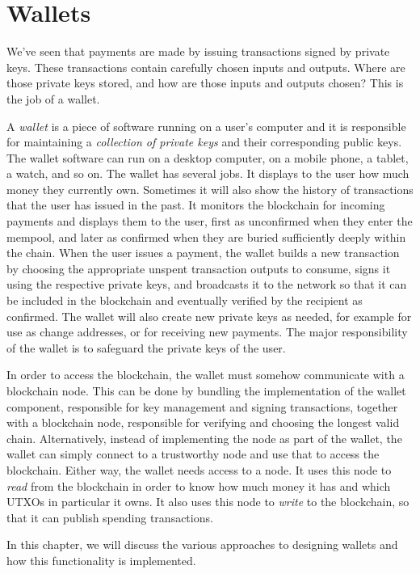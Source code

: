 \chapter{Wallets}

We've seen that payments are made by issuing transactions signed by private keys.
These transactions contain carefully chosen inputs and outputs. Where are those
private keys stored, and how are those inputs and outputs chosen? This is the job
of a wallet.

A \emph{wallet} is a piece of software running on a user's computer and it is
responsible for maintaining a \emph{collection of private keys} and their corresponding
public keys. The wallet software can run on a desktop computer, on a mobile phone,
a tablet, a watch, and so on.
The wallet has several jobs. It displays to the user how much money they
currently own. Sometimes it will also show the history of transactions that the user
has issued in the past. It monitors the blockchain for incoming payments and displays
them to the user, first as unconfirmed when they enter the mempool, and later as confirmed
when they are buried sufficiently deeply within the chain. When the user issues
a payment, the wallet builds a new transaction by choosing the appropriate unspent transaction
outputs to consume, signs it using the respective private keys, and broadcasts it to the
network so that it can be included in the blockchain and eventually verified by the recipient
as confirmed. The wallet will also create new private keys as needed, for example for
use as change addresses, or for receiving new payments. The major responsibility
of the wallet is to safeguard the private keys of the user.

In order to access the blockchain, the wallet must somehow communicate
with a blockchain node. This can be done by bundling the implementation of the
wallet component, responsible for key management and signing transactions, together
with a blockchain node, responsible for verifying and choosing the longest valid chain.
Alternatively, instead of implementing the node as part of the wallet, the
wallet can simply connect to a trustworthy node and use that to access the
blockchain. Either way, the wallet needs access to a node. It uses this node to
\emph{read} from the blockchain in order to know how much money it has and which UTXOs in
particular it owns. It also uses this node to \emph{write} to the blockchain,
so that it can publish spending transactions.

In this chapter, we will discuss the various approaches to designing wallets and how
this functionality is implemented.

